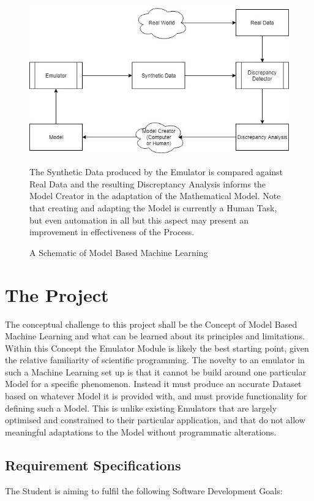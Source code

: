 \documentclass{article}
\begin{document}
    \begin{figure}[h]
      \centering
      \includegraphics[width=0.7\linewidth]{figures/ModelLearning}
      \caption{A Schematic of Model Based Machine Learning}The Synthetic Data produced by the Emulator is compared against Real Data and the resulting Discreptancy Analysis informs the Model Creator in the adaptation of the Mathematical Model. Note that creating and adapting the Model is currently a Human Task, but even automation in all but this aspect may present an improvement in effectiveness of the Process.
      \label{fig:modelLearning}
  \end{figure}

\section{The Project}

The conceptual challenge to this project shall be the Concept of Model Based Machine Learning and what can be learned about its principles and limitations.
\\ Within this Concept the Emulator Module is likely the best starting point, given the relative familiarity of scientific programming. The novelty to an emulator in such a Machine Learning set up is that it cannot be build around one particular Model for a specific phenomenon. Instead it must produce an accurate Dataset based on whatever Model it is provided with, and must provide functionality for defining such a Model. This is unlike existing Emulators that are largely optimised and constrained to their particular application, and that do not allow meaningful adaptations to the Model without programmatic alterations.

  \subsection{Requirement Specifications}
  
The Student is aiming to fulfil the following Software Development Goals:
\end{document}

